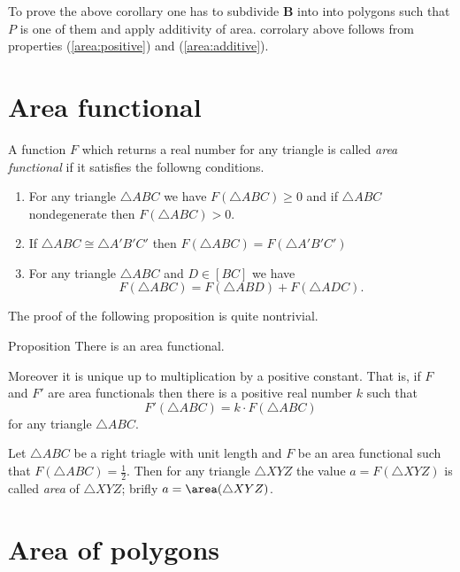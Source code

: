 {To prove the above corollary one has to subdivide $\bm{B}$ into into polygons
such that $P$ is one of them and apply additivity of area.
corrolary above 
follows from properties 
(\ref{area:positive}) and (\ref{area:additive}).






\section*{Area functional}

A function $F$ which returns a real number 
for any triangle is called \emph{area functional} if it satisfies the followng conditions.

\begin{enumerate}
\item For any triangle $\triangle ABC$ we have $F(\triangle ABC)\ge 0$ and 
if  $\triangle ABC$ nondegenerate then $F(\triangle ABC)>0$.
\item If $\triangle ABC\cong\triangle A'B'C'$ 
 then $F(\triangle ABC)=F(\triangle A'B'C')$
\item For any triangle $ \triangle ABC$ and $D\in [BC]$ we have
$$F(\triangle ABC)=F(\triangle ABD)+F(\triangle ADC).$$
\end{enumerate}

The proof of the following proposition is quite nontrivial.

\begin{thm}{Proposition}
There is an area functional. 

Moreover it is unique up to multiplication by a positive constant. 
That is, if $F$ and $F'$ are area functionals then there is a positive real number $k$ such that 
\[F'(\triangle ABC)=k\cdot F(\triangle ABC)\]
for any triangle $\triangle ABC$.
\end{thm}

Let $\triangle ABC$ be a right triagle with unit length
and $F$ be an area functional such that $F(\triangle ABC)=\tfrac12$.
Then for any triangle $\triangle XYZ$ the value $a=F(\triangle XYZ)$ is called \emph{area} of $\triangle XYZ$;
brifly $a=\area(\triangle XYZ)$.






\section*{Area of polygons}

}
